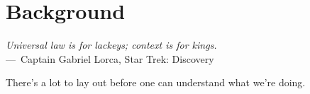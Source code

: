 
\chapter{Background}
\label{ch:Background}

\begin{epigraph}
	\emph{Universal law is for lackeys; context is for kings.}\\
	---~Captain Gabriel Lorca, Star Trek: Discovery
\end{epigraph}

There's a lot to lay out before one can understand what we're doing.

\endinput